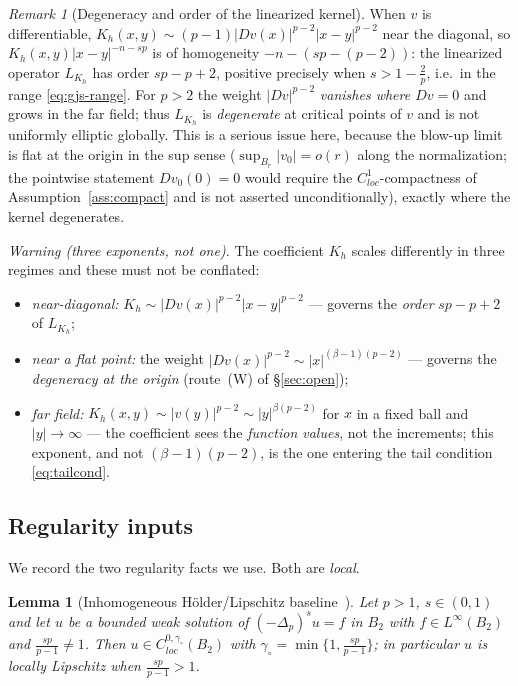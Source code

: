 \documentclass[11pt]{amsart}
\theoremstyle{plain}
\newtheorem{lemma}[theorem]{Lemma}
\theoremstyle{definition}
\theoremstyle{remark}
\newtheorem{remark}[theorem]{Remark}
\newcommand{\fpl}[1]{(-\Delta_p)^{s}#1}
\begin{document}
\begin{remark}[Degeneracy and order of the linearized kernel]\label{rem:order}
When $v$ is differentiable, $K_h(x,y)\sim(p-1)|Dv(x)|^{p-2}|x-y|^{p-2}$ near
the diagonal, so $K_h(x,y)|x-y|^{-n-sp}$ is of homogeneity $-n-(sp-(p-2))$:
the linearized operator $L_{K_h}$ has order $sp-p+2$, positive precisely when
$s>1-\frac2p$, i.e.\ in the range \eqref{eq:gjs-range}. For $p>2$ the weight
$|Dv|^{p-2}$ \emph{vanishes where $Dv=0$} and grows in the far field; thus
$L_{K_h}$ is \emph{degenerate} at critical points of $v$ and is not uniformly
elliptic globally. This is a serious issue here, because the blow-up limit is
flat at the origin in the sup sense ($\sup_{B_r}|v_0|=o(r)$ along the
normalization; the pointwise statement $Dv_0(0)=0$ would require the
$C^1_{loc}$-compactness of Assumption~\ref{ass:compact} and is not asserted
unconditionally), exactly where the kernel degenerates.

\emph{Warning (three exponents, not one).} The coefficient $K_h$ scales
differently in three regimes and these must not be conflated:
\begin{itemize}[leftmargin=2em]
\item \emph{near-diagonal:} $K_h\sim|Dv(x)|^{p-2}|x-y|^{p-2}$ --- governs the
  \emph{order} $sp-p+2$ of $L_{K_h}$;
\item \emph{near a flat point:} the weight $|Dv(x)|^{p-2}\sim
  |x|^{(\beta-1)(p-2)}$ --- governs the \emph{degeneracy at the origin}
  (route~(W) of \S\ref{sec:open});
\item \emph{far field:} $K_h(x,y)\sim|v(y)|^{p-2}\sim|y|^{\beta(p-2)}$ for
  $x$ in a fixed ball and $|y|\to\infty$ --- the coefficient sees the
  \emph{function values}, not the increments; this exponent, and not
  $(\beta-1)(p-2)$, is the one entering the tail condition
  \eqref{eq:tailcond}.
\end{itemize}
\end{remark}

\subsection{Regularity inputs}
We record the two regularity facts we use. Both are \emph{local}.

\begin{lemma}[Inhomogeneous H\"older/Lipschitz baseline~\cite{BT}]\label{lem:bt}
Let $p>1$, $s\in(0,1)$ and let $u$ be a bounded weak solution of $\fpl{u}=f$
in $B_2$ with $f\in L^\infty(B_2)$ and $\frac{sp}{p-1}\neq1$. Then
$u\in C^{0,\gamma_\circ}_{loc}(B_2)$ with
$\gamma_\circ=\min\{1,\frac{sp}{p-1}\}$; in particular $u$ is locally Lipschitz
when $\frac{sp}{p-1}>1$.
\end{lemma}
\end{document}
